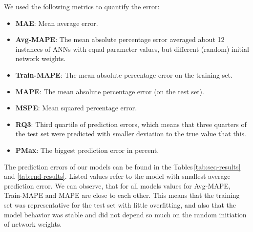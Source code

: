 \documentclass{superfri}
\begin{document}
	We used the following metrics to quantify the error:	
	\begin{itemize}
		\item \textbf{MAE}: Mean average error.
		\item \textbf{Avg-MAPE}: The mean absolute percentage error averaged about 12 instances of ANNs with equal parameter values, but different (random) initial network weights.
		\item \textbf{Train-MAPE}: The mean absolute percentage error on the training set. 
		\item \textbf{MAPE}: The mean absolute percentage error (on the test set).
		\item \textbf{MSPE}: Mean squared percentage error.
		\item \textbf{RQ3}: Third quartile of prediction errors, which means that three quarters of the test set were predicted with smaller deviation to the true value that this.
		\item \textbf{PMax}: The biggest prediction error in percent.
	\end{itemize}
	The prediction errors of our models can be found in the Tables\,\ref{tab:seq-results} and \ref{tab:rnd-results}.
	Listed values refer to the model with smallest average prediction error.
	We can observe, that for all models values for Avg-MAPE, Train-MAPE and MAPE are close to each other.
	This means that the training set was representative for the test set with little overfitting, and also that the model behavior was stable and did not depend so much on the random initiation of network weights.
	
\end{document}
